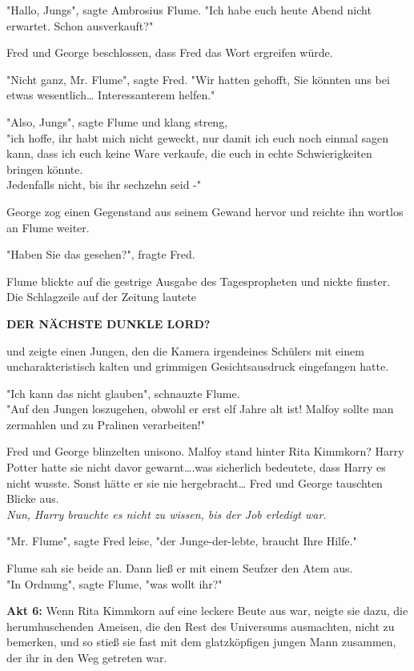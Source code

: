 {"Hallo, Jungs", sagte Ambrosius Flume. "Ich habe euch heute Abend nicht erwartet. Schon ausverkauft?"

Fred und George beschlossen, dass Fred das Wort ergreifen würde.

"Nicht ganz, Mr. Flume", sagte Fred. "Wir hatten gehofft, Sie könnten uns bei etwas wesentlich… Interessanterem helfen."

"Also, Jungs", sagte Flume und klang streng,\\ "ich hoffe, ihr habt mich nicht geweckt, nur damit ich euch noch einmal sagen kann, dass ich euch keine Ware verkaufe, die euch in echte Schwierigkeiten bringen könnte.\\ Jedenfalls nicht, bis ihr sechzehn seid -"

George zog einen Gegenstand aus seinem Gewand hervor und reichte ihn wortlos an Flume weiter.

"Haben Sie das gesehen?", fragte Fred.

Flume blickte auf die gestrige Ausgabe des Tagespropheten und nickte finster.\\ Die Schlagzeile auf der Zeitung lautete

\textbf{DER NÄCHSTE DUNKLE LORD?}

und zeigte einen Jungen, den die Kamera irgendeines Schülers mit einem uncharakteristisch kalten und grimmigen Gesichtsausdruck eingefangen hatte.

"Ich kann das nicht glauben", schnauzte Flume.\\ "Auf den Jungen loszugehen, obwohl er erst elf Jahre alt ist! Malfoy sollte man zermahlen und zu Pralinen verarbeiten!"

Fred und George blinzelten unisono. Malfoy stand hinter Rita Kimmkorn? Harry Potter hatte sie nicht davor gewarnt….was sicherlich bedeutete, dass Harry es nicht wusste. Sonst hätte er sie nie hergebracht… Fred und George tauschten Blicke aus.\\ \emph{Nun, Harry brauchte es nicht zu wissen, bis der Job erledigt war.}

"Mr. Flume", sagte Fred leise, "der Junge-der-lebte, braucht Ihre Hilfe."

Flume sah sie beide an. Dann ließ er mit einem Seufzer den Atem aus.\\ "In Ordnung", sagte Flume, "was wollt ihr?"

\textbf{Akt 6:} Wenn Rita Kimmkorn auf eine leckere Beute aus war, neigte sie dazu, die herumhuschenden Ameisen, die den Rest des Universums ausmachten, nicht zu bemerken, und so stieß sie fast mit dem glatzköpfigen jungen Mann zusammen, der ihr in den Weg getreten war.

}
